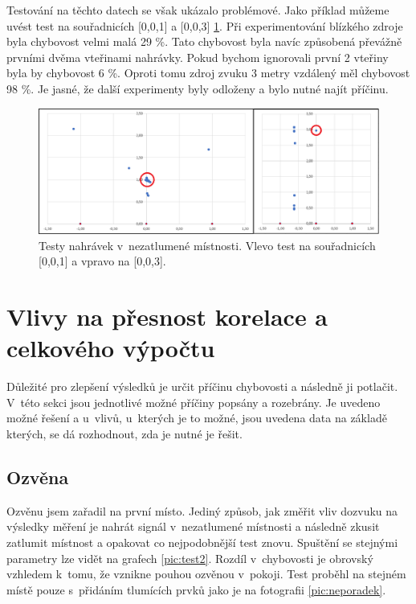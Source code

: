 Testování na těchto datech se však ukázalo problémové. Jako příklad můžeme uvést test na souřadnicích [0,0,1] a [0,0,3] \ref{pic:test1}. Při experimentování blízkého zdroje byla chybovost velmi malá 29 \%. Tato chybovost byla navíc způsobená převážně prvními dvěma vteřinami nahrávky. Pokud bychom ignorovali první 2 vteřiny byla by chybovost 6 \%. Oproti tomu zdroj zvuku 3 metry vzdálený měl chybovost 98 \%. Je jasné, že další experimenty byly odloženy a bylo nutné najít příčinu.

\begin{figure}[!ht]
	\centering
	\includegraphics[width=1\textwidth]{obrazky-figures/graf_nezatlumene.png}
	\caption{Testy nahrávek v~nezatlumené místnosti. Vlevo test na souřadnicích [0,0,1] a vpravo na [0,0,3].}
	\label{pic:test1}
\end{figure}

\section{Vlivy na přesnost korelace a celkového výpočtu}
\label{vlivy}

Důležité pro zlepšení výsledků je určit příčinu chybovosti a následně ji potlačit. V~této sekci jsou jednotlivé možné příčiny popsány a rozebrány. Je uvedeno možné řešení a u~vlivů, u~kterých je to možné, jsou uvedena data na základě kterých, se dá rozhodnout, zda je nutné je řešit.

\subsection{Ozvěna}

Ozvěnu jsem zařadil na první místo. Jediný způsob, jak změřit vliv dozvuku na výsledky měření je nahrát signál v~nezatlumené místnosti a následně zkusit zatlumit místnost a opakovat co nejpodobnější test znovu. Spuštění se stejnými parametry lze vidět na grafech \ref{pic:test2}. Rozdíl v~chybovosti je obrovský vzhledem k~tomu, že vznikne pouhou ozvěnou v~pokoji. Test proběhl na stejném místě pouze s~přidáním tlumících prvků jako je na fotografii \ref{pic:neporadek}.

